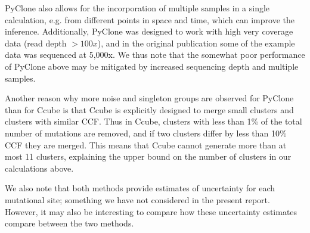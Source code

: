 \documentclass{article}
\begin{document}
PyClone also allows for the incorporation of multiple samples in a single calculation, e.g. from different points in space and time, which can improve the inference. Additionally, PyClone was designed to work with high very coverage data (read depth $> 100x$), and in the original publication some of the example data was sequenced at 5,000x. We thus note that the somewhat poor performance of PyClone above may be mitigated by increased sequencing depth and multiple samples.

Another reason why more noise and singleton groups are observed for PyClone than for Ccube is that Ccube is explicitly designed to merge small clusters and clusters with similar CCF. Thus in Ccube, clusters with less than 1\% of the total number of mutations are removed, and if two clusters differ by less than 10\% CCF they are merged. This means that Ccube cannot  generate more than at most 11 clusters, explaining the upper bound on the number of clusters in our calculations above.

We also note that both methods provide estimates of uncertainty for each mutational site; something we have not considered in the present report. However, it may also be interesting to compare how these uncertainty estimates compare between the two methods.
\end{document}
